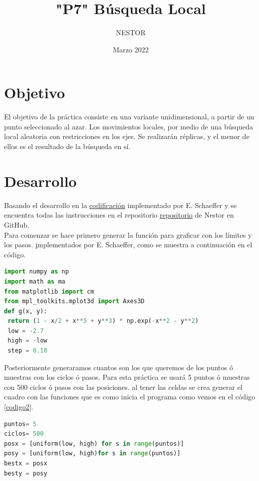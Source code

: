 \documentclass{article}
\title{"P7" Búsqueda Local}
\author{NESTOR}
\date {Marzo 2022}
\begin{document}
\maketitle

\section{Objetivo}\label{obj}
El objetivo de la práctica consiste en una variante unidimensional, a partir de un punto seleccionado al azar. Los movimientos locales, por medio de una búsqueda local aleatoria con restricciones en los ejes. Se realizarán  réplicas, y el menor de ellos es el resultado de la búsqueda en sí. \cite{elisa1}

\section{Desarrollo}\label{des}
Basando el desarrollo en la \href{https://github.com/satuelisa/Simulation/blob/master/LocalSearch/minimize1D.py}{codificación} implementado por E. Schaeffer \cite{elisa1} y se encuentra todas las instrucciones en el repositorio \href{https://github.com/NestorZeus/SIMULACION-COMPUTACIONAL-DE-NANOMATERIALES/tree/main/Phttps://github.com/NestorZeus/SIMULACION-COMPUTACIONAL-DE-NANOMATERIALES/tree/main/P7}{repositorio} de Nestor en GitHub.\\

Para comenzar se hace primero generar la función para graficar con los límites y los pasos.  \href{https://github.com/satuelisa/Simulation/blob/master/LocalSearch/minimize1D.py} implementados por E. Schaeffer, como se muestra a continuación en el código.

\begin{lstlisting}[caption=Generamos la función, language=Python]
import numpy as np
import math as ma
from matplotlib import cm
from mpl_toolkits.mplot3d import Axes3D
def g(x, y):
 return (1 - x/2 + x**5 + y**3) * np.exp(-x**2 - y**2)
 low = -2.7
 high = -low
 step = 0.10
\end{lstlisting}

Posteriormente generaramos cuantos son los que queremos de los puntos ó muestras con los ciclos ó pasos. Para esta práctica se usará 5 puntos ó muestras con 500 ciclos ó pasos con las posiciones. al tener las celdas se crea generar el cuadro con las funciones que es como inicia el programa como vemos en el código \ref{codigo2}.

\begin{lstlisting}[caption=Generamos los puntos ó muestras y los ciclos ó pasos, label=codigo2, language=Python]
puntos= 5
ciclos= 500
posx = [uniform(low, high) for s in range(puntos)]
posy = [uniform(low, high)for s in range(puntos)]
bestx = posx
besty = posy
\end{lstlisting}
\end{document}
